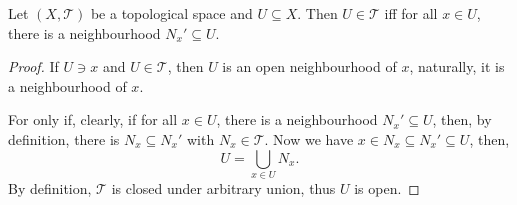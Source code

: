 \begin{lemma}
	Let $(X, \mathcal T)$ be a topological space and $U \subseteq X$. Then $U \in \mathcal T$ iff for all $x \in U$, there is a neighbourhood $N_x' \subseteq U$.
\end{lemma}


\begin{proof}
	If $U \ni x$ and $U \in \mathcal T$, then $U$ is an open neighbourhood of $x$, naturally, it is a neighbourhood of $x$.
	
	For only if, clearly, if for all $x \in U$, there is a neighbourhood $N_x' \subseteq U$, then, by definition, there is $N_x \subseteq N_x'$ with $N_x \in \mathcal T$. Now we have $x \in N_x \subseteq N_x' \subseteq U$, then,
	$$
	U = \bigcup_{x \in U} N_x.
	$$
	By definition, $\mathcal T$ is closed under arbitrary union, thus $U$ is open.
\end{proof}









































%
